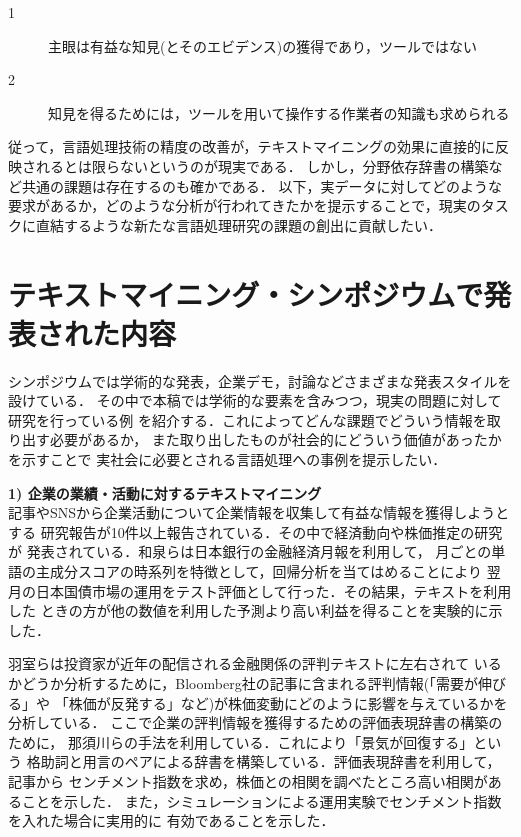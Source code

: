 \documentclass[twocolumn]{jarticle}
\begin{document}
\begin{description}
\item[1] 主眼は有益な知見(とそのエビデンス)の獲得であり，ツールではない
\item[2] 知見を得るためには，ツールを用いて操作する作業者の知識も求められる
\end{description}

従って，言語処理技術の精度の改善が，テキストマイニングの効果に直接的に反映されるとは限らないというのが現実である．
しかし，分野依存辞書の構築\cite{nasukawa04}など共通の課題は存在するのも確かである．
以下，実データに対してどのような要求があるか，どのような分析が行われてきたかを提示することで，現実のタスクに直結するような新たな言語処理研究の課題の創出に貢献したい．


\section{テキストマイニング・シンポジウムで発表された内容}
シンポジウムでは学術的な発表，企業デモ，討論などさまざまな発表スタイルを設けている．
その中で本稿では学術的な要素を含みつつ，現実の問題に対して研究を行っている例
を紹介する．これによってどんな課題でどういう情報を取り出す必要があるか，
また取り出したものが社会的にどういう価値があったかを示すことで
実社会に必要とされる言語処理への事例を提示したい．

{\bf 1) 企業の業績・活動に対するテキストマイニング}\\
記事やSNSから企業活動について企業情報を収集して有益な情報を獲得しようとする
研究報告が10件以上報告されている．その中で経済動向や株価推定の研究が
発表されている．和泉ら\cite{izumi2011}は日本銀行の金融経済月報を利用して，
月ごとの単語の主成分スコアの時系列を特徴として，回帰分析を当てはめることにより
翌月の日本国債市場の運用をテスト評価として行った．その結果，テキストを利用した
ときの方が他の数値を利用した予測より高い利益を得ることを実験的に示した．

羽室ら\cite{hamuro2011}は投資家が近年の配信される金融関係の評判テキストに左右されて
いるかどうか分析するために，Bloomberg社の記事に含まれる評判情報(「需要が伸びる」や
「株価が反発する」など)が株価変動にどのように影響を与えているかを分析している．
ここで企業の評判情報を獲得するための評価表現辞書の構築のために，
那須川ら\cite{nasukawa04}の手法を利用している．これにより「景気が回復する」という
格助詞と用言のペアによる辞書を構築している．評価表現辞書を利用して，記事から
センチメント指数を求め，株価との相関を調べたところ高い相関があることを示した．
また，シミュレーションによる運用実験でセンチメント指数を入れた場合に実用的に
有効であることを示した．
\end{document}
